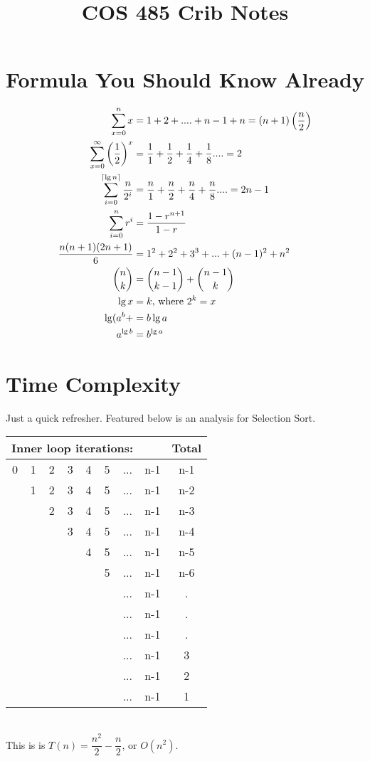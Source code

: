 \documentclass[aip, jmp, amsmath,amssymb, reprint]{revtex4-1}
\DeclarePairedDelimiter\ceil{\lceil}{\rceil}
\theoremstyle{definition}
\begin{document}
\title{COS 485 Crib Notes}
\author{}
\maketitle
\section{Formula You Should Know Already}
\begin{align*}
    \sum\limits_{x = 0}^{n} x &= 1 + 2 +....+n-1 + n = (n+1)\left(\frac{n}{2}\right)\\
    \sum\limits_{x = 0}^{\infty} \left(\frac{1}{2}\right)^x &= \frac{1}{1} + \frac{1}{2} + \frac{1}{4} + \frac{1}{8}.... = 2\\
    \sum\limits_{i = 0}^{\ceil{\lg n}} \frac{n}{2^i} &= \frac{n}{1} + \frac{n}{2} + \frac{n}{4} + \frac{n}{8}.... = 2n-1\\
    \sum\limits_{i = 0}^{n} r^i &= \frac{1-r^{n+1}}{1-r}\\
    \frac{n(n+1)(2n+1)}{6} &= 1^2 + 2^2 + 3^3 +...+ (n-1)^2 + n^2\\
    \binom{n}{k} &= \binom{n - 1}{k - 1} + \binom{n - 1}{k}\\
    \lg x &= k\text{, where } 2^k = x\\
    \lg(a^b+ &= b \lg a\\
    a^{\lg b} &= b^{\lg a}
\end{align*}

\section{Time Complexity}
Just a quick refresher. Featured below is an analysis for Selection Sort.\\
\begin{tabular}{c c c c c c c c | c}
\multicolumn{7}{l}{Inner loop iterations:} & & Total\\
\hline
0 & 1 & 2 & 3 & 4 & 5 &...& n-1 & n-1\\
    & 1 & 2 & 3 & 4 & 5 &... & n-1 & n-2\\
    &   & 2 & 3 & 4 & 5 &... & n-1 & n-3\\
    &   &   & 3 & 4 & 5 &... & n-1 & n-4\\
    &   &   &   & 4 & 5 &... & n-1 & n-5\\
    &   &   &   &   & 5 &... & n-1 & n-6\\
    &   &   &   &   &   &... & n-1 & .\\
    &   &   &   &   &   &... & n-1 & .\\
    &   &   &   &   &   &... & n-1 & .\\
    &   &   &   &   &   &... & n-1 & 3\\
    &   &   &   &   &   &... & n-1 & 2\\
    &   &   &   &   &   &... & n-1 & 1\\
\end{tabular}\\
This is is $T(n) = \dfrac{n^2}{2} - \dfrac{n}{2}$, or $O(n^2)$.\\
\end{document}
